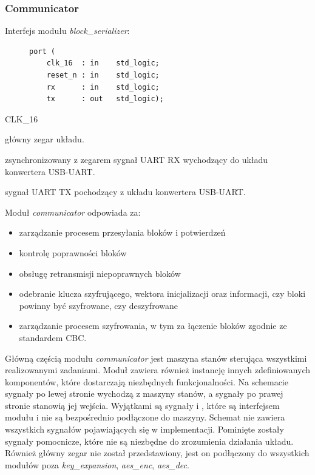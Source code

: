 \subsubsection{Communicator}

Interfejs modułu \textit{block\_serializer}:

\begin{figure}[!h]
\begin{lstlisting}[style=vhdl]
port (
	clk_16  : in    std_logic;
	reset_n : in    std_logic;
	rx      : in    std_logic;
	tx      : out   std_logic);
\end{lstlisting}
\end{figure}

\begin{interface}{CLK\_16}
	\item[\insignal{CLK\_16}] główny zegar układu.
	\item[\insignal{RX}] zsynchronizowany z zegarem  sygnał UART RX wychodzący do układu konwertera USB-UART.
	\item[\outsignal{TX}] sygnał UART TX pochodzący z układu konwertera USB-UART.
\end{interface}

Moduł \textit{communicator} odpowiada za:
\begin{itemize}[noitemsep, nolistsep]
\item zarządzanie procesem przesyłania bloków i potwierdzeń
\item kontrolę poprawności bloków
\item obsługę retransmisji niepoprawnych bloków
\item odebranie klucza szyfrującego, wektora inicjalizacji oraz informacji, czy bloki powinny być szyfrowane, czy deszyfrowane
\item zarządzanie procesem szyfrowania, w tym za łączenie bloków zgodnie ze standardem CBC.
\end{itemize}

Główną częścią modułu \textit{communicator} jest maszyna stanów sterująca wszystkimi realizowanymi zadaniami. Moduł zawiera również instancję innych zdefiniowanych komponentów, które dostarczają niezbędnych funkcjonalności. Na schemacie sygnały po lewej stronie wychodzą z maszyny stanów, a sygnały po prawej stronie stanowią jej wejścia. Wyjątkami są sygnały  i , które są interfejsem modułu i nie są bezpośrednio podłączone do maszyny. Schemat nie zawiera wszystkich sygnałów pojawiających się w implementacji. Pominięte zostały sygnały pomocnicze, które nie są niezbędne do zrozumienia działania układu. Również główny zegar nie został przedstawiony, jest on podłączony do wszystkich modułów poza \textit{key\_expansion}, \textit{aes\_enc}, \textit{aes\_dec}.

